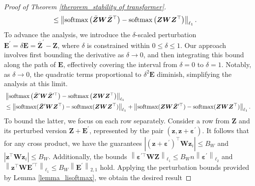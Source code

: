 \begin{proof}[Proof of Theorem \ref{therorem_stability of transformer}]
\begin{align}
& \leq\left\|\operatorname{softmax}\left(\bar{\boldsymbol{Z}} \boldsymbol{W} \bar{\boldsymbol{Z}}^{\top}\right)-\operatorname{softmax}\left(\boldsymbol{Z} \boldsymbol{W} \boldsymbol{Z}^{\top}\right)\right\|_{\ell_1} .\notag
\end{align}
To advance the analysis, we introduce the $\delta$-scaled perturbation $\boldsymbol{E}^{\prime}=\delta \boldsymbol{E}=\bar{\boldsymbol{Z}}^{\prime}-\boldsymbol{Z}$, where $\delta$ is constrained within $0 \leq \delta \leq 1$. Our approach involves first bounding the derivative as $\delta \rightarrow 0$, and then integrating this bound along the path of $\boldsymbol{E}$, effectively covering the interval from $\delta=0$ to $\delta=1$. Notably, as $\delta \rightarrow 0$, the quadratic terms proportional to $\delta^2 \boldsymbol{E}$ diminish, simplifying the analysis at this limit. 
\begin{align}
&\left\|\operatorname{softmax}\left(\bar{\boldsymbol{Z}}^{\prime} \boldsymbol{W} \bar{\boldsymbol{Z}}^{\prime \top}\right)-\operatorname{softmax}\left(\boldsymbol{Z} \boldsymbol{W} \boldsymbol{Z}^{\top}\right)\right\|_{\ell_1} \notag \\
&\leq\left\|\operatorname{softmax}(\bar{\boldsymbol{Z}}^{\prime} \boldsymbol{W} \boldsymbol{Z}^{\top})-\operatorname{softmax}(\boldsymbol{Z} \boldsymbol{W} \boldsymbol{Z}^{\top})\right\|_{\ell_1}+\left\|\operatorname{softmax}(\boldsymbol{Z} \boldsymbol{W} \bar{\boldsymbol{Z}}^{\prime \top})-\operatorname{softmax}(\boldsymbol{Z} \boldsymbol{W} \boldsymbol{Z}^{\top})\right\|_{\ell_1} . \notag
\end{align}
To bound the latter, we focus on each row separately. Consider a row from $\boldsymbol{Z}$ and its perturbed version $\boldsymbol{Z}+\boldsymbol{E}^{\prime}$, represented by the pair $\left(\boldsymbol{z}, \boldsymbol{z}+\boldsymbol{\varepsilon^{\prime}}\right)$. It follows that for any cross product, we have the guarantees $\left|\left(\boldsymbol{z}+\boldsymbol{\varepsilon^{\prime}}\right)^{\top} \boldsymbol{W} \boldsymbol{z}_i\right| \leq B_W$ and $\left|\boldsymbol{z}^{\top} \boldsymbol{W} \boldsymbol{z}_i\right| \leq B_W$. Additionally, the bounds $\left\|\boldsymbol{\varepsilon}^{\prime \top} \boldsymbol{W} \boldsymbol{Z}\right\|_{\ell_1} \leq B_W n\left\|\boldsymbol{\varepsilon}^{\prime}\right\|_{\ell_2}$ and $\left\|\boldsymbol{z}^{\top} \boldsymbol{W} \boldsymbol{E}^{\prime \top}\right\|_{\ell_1} \leq B_W\left\|\boldsymbol{E}^{\prime}\right\|_{2,1}$ hold. Applying the perturbation bounds provided by Lemma \ref{lemma_lisoftmax}, we obtain the desired result

\end{proof}
